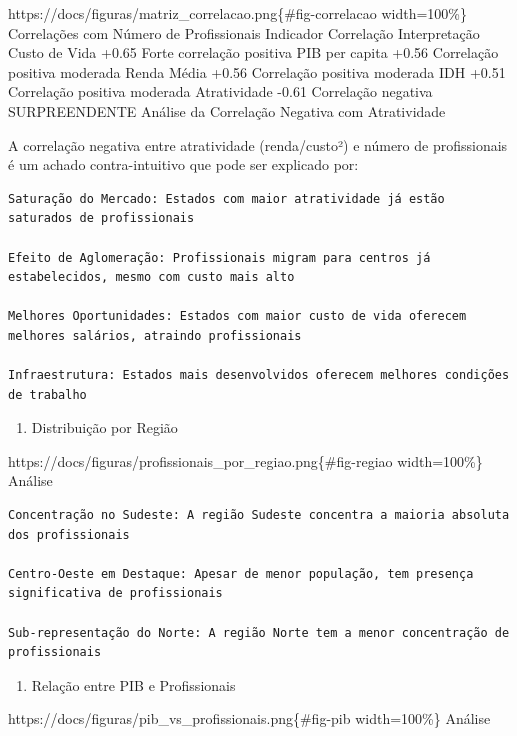 \documentclass[
  11pt,
  letterpaper,
  DIV=11,
  numbers=noendperiod]{scrartcl}
\providecommand{\tightlist}{%
  \setlength{\itemsep}{0pt}\setlength{\parskip}{0pt}}
\begin{document}
https://docs/figuras/matriz\_correlacao.png\{\#fig-correlacao
width=100\%\} Correlações com Número de Profissionais Indicador
Correlação Interpretação Custo de Vida +0.65 Forte correlação positiva
PIB per capita +0.56 Correlação positiva moderada Renda Média +0.56
Correlação positiva moderada IDH +0.51 Correlação positiva moderada
Atratividade -0.61 Correlação negativa SURPREENDENTE Análise da
Correlação Negativa com Atratividade

A correlação negativa entre atratividade (renda/custo²) e número de
profissionais é um achado contra-intuitivo que pode ser explicado por:

\begin{verbatim}
Saturação do Mercado: Estados com maior atratividade já estão saturados de profissionais

Efeito de Aglomeração: Profissionais migram para centros já estabelecidos, mesmo com custo mais alto

Melhores Oportunidades: Estados com maior custo de vida oferecem melhores salários, atraindo profissionais

Infraestrutura: Estados mais desenvolvidos oferecem melhores condições de trabalho
\end{verbatim}

\begin{enumerate}
\def\labelenumi{\arabic{enumi}.}
\setcounter{enumi}{3}
\tightlist
\item
  Distribuição por Região
\end{enumerate}

https://docs/figuras/profissionais\_por\_regiao.png\{\#fig-regiao
width=100\%\} Análise

\begin{verbatim}
Concentração no Sudeste: A região Sudeste concentra a maioria absoluta dos profissionais

Centro-Oeste em Destaque: Apesar de menor população, tem presença significativa de profissionais

Sub-representação do Norte: A região Norte tem a menor concentração de profissionais
\end{verbatim}

\begin{enumerate}
\def\labelenumi{\arabic{enumi}.}
\setcounter{enumi}{4}
\tightlist
\item
  Relação entre PIB e Profissionais
\end{enumerate}

https://docs/figuras/pib\_vs\_profissionais.png\{\#fig-pib width=100\%\}
Análise
\end{document}
